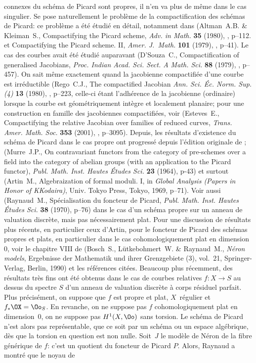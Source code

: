 \begin{remarques}
connexes du sch\'ema de Picard sont propres, il n'en va plus de m\^eme dans le cas singulier. Se pose naturellement le probl\`eme de la compactification des sch\'emas de Picard: ce probl\`eme a \'et\'e \'etudi\'e en d\'etail, notamment dans (Altman~A.B. \& Kleiman~S., {\og Compactifying the Picard scheme\fg}, \emph{Adv. in Math.} \textbf{35} (1980), , p--112. et {\og Compactifying the Picard scheme. II\fg}, \emph{Amer. J.~Math.} \textbf{101} (1979), , p--41). Le cas des courbes avait \'et\'e \'etudi\'e auparavant (D'Souza~C., {\og Compactification of generalised Jacobians\fg}, \emph{Proc. Indian Acad. Sci. Sect. A Math. Sci.} \textbf{88} (1979), , p--457). On sait m\^eme exactement quand la jacobienne compactifi\'ee d'une courbe est irr\'eductible (Rego~C.J., {\og The compactified Jacobian\fg} \emph{Ann. Sci. \'Ec. Norm. Sup. (4)} \textbf{13} (1980), , p--223, celle-ci \'etant l'adh\'erence de la jacobienne (ordinaire) lorsque la courbe est g\'eom\'etriquement int\`egre et localement planaire; pour une construction en famille des jacobiennes compactifi\'ees, voir (Esteves~E., {\og Compactifying the relative Jacobian over families of reduced curves\fg}, \emph{Trans. Amer. Math. Soc.} \textbf{353} (2001), , p--3095). Depuis, les r\'esultats d'existence du sch\'ema de Picard dans le cas propre ont progress\'e depuis l'\'edition originale de ; \cf (Murre~J.P., {\og On contravariant functors from the category of pre-schemes over a field into the category of abelian groups (with an application to the Picard functor)\fg}, \emph{Publ. Math. Inst. Hautes \'Etudes Sci.} \textbf{23} (1964), p-43) et surtout (Artin~M., {\og Algebraization of formal moduli. I\fg}, in \emph{Global Analysis (Papers in Honor of K\ptbl Kodaira)}, Univ. Tokyo Press, Tokyo, 1969, p--71). Voir aussi (Raynaud~M., {\og Sp\'ecialisation du foncteur de Picard\fg}, \emph{Publ. Math. Inst. Hautes \'Etudes Sci.} \textbf{38} (1970), p--76) dans le cas d'un sch\'ema propre sur un anneau de valuation discr\`ete, mais pas n\'ecessairement plat. Pour une discussion de r\'esultats plus r\'ecents, en particulier ceux d'Artin, pour le foncteur de Picard des sch\'emas propres et plats, en particulier dans le cas cohomologiquement plat en dimension $0$, voir le chapitre VIII de (Bosch~S., Lütkebohmert~W. \& Raynaud~M., \emph{N\'eron models}, Ergebnisse der Mathematik und ihrer Grenzgebiete (3), vol.~21, Springer-Verlag, Berlin, 1990) et les r\'ef\'erences cit\'ees. Beaucoup plus r\'ecemment, des r\'esultats tr\`es fins ont \'et\'e obtenus dans le cas de courbes relatives $f:X\to S$ au dessus du spectre $S$ d'un anneau de valuation discr\`ete \`a corps r\'esiduel parfait. Plus pr\'ecis\'ement, on suppose que $f$ est propre et plat, $X$~r\'egulier et $f_*\OX=\Oo_S$. En revanche, on ne suppose pas $f$ cohomologiquement plat en dimension~$0$, \ie on ne suppose pas $H^1(X,\Oo)$ sans torsion. Le sch\'ema de Picard n'est alors pas repr\'esentable, que ce soit par un sch\'ema ou un espace alg\'ebrique, d\`es que la torsion en question est non nulle. Soit~$J$ le mod\`ele de N\'eron de la fibre g\'en\'erique de $f$: c'est un quotient du foncteur de Picard $P$. Alors, Raynaud a montr\'e que le noyau de 
\end{remarques}
